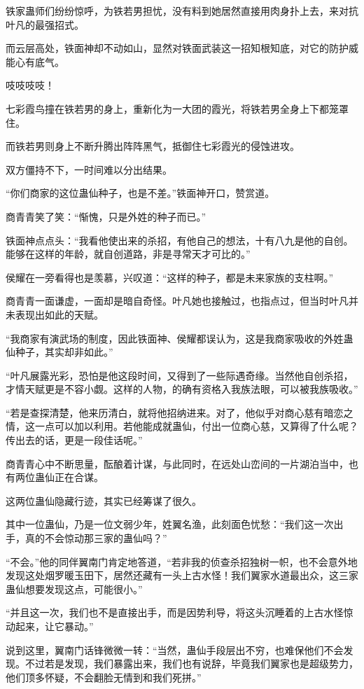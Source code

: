 \begin{this_body}
铁家蛊师们纷纷惊呼，为铁若男担忧，没有料到她居然直接用肉身扑上去，来对抗叶凡的最强招式。

而云层高处，铁面神却不动如山，显然对铁面武装这一招知根知底，对它的防护威能心有底气。

吱吱吱吱！

七彩霞鸟撞在铁若男的身上，重新化为一大团的霞光，将铁若男全身上下都笼罩住。

而铁若男则身上不断升腾出阵阵黑气，抵御住七彩霞光的侵蚀进攻。

双方僵持不下，一时间难以分出结果。

“你们商家的这位蛊仙种子，也是不差。”铁面神开口，赞赏道。

商青青笑了笑：“惭愧，只是外姓的种子而已。”

铁面神点点头：“我看他使出来的杀招，有他自己的想法，十有八九是他的自创。能够在这样的年龄，就自创道路，非是寻常天才可比的。”

侯耀在一旁看得也是羡慕，兴叹道：“这样的种子，都是未来家族的支柱啊。”

商青青一面谦虚，一面却是暗自奇怪。叶凡她也接触过，也指点过，但当时叶凡并未表现出如此的天赋。

“我商家有演武场的制度，因此铁面神、侯耀都误认为，这是我商家吸收的外姓蛊仙种子，其实却非如此。”

“叶凡展露光彩，恐怕是他这段时间，又得到了一些际遇奇缘。当然他自创杀招，才情天赋更是不容小觑。这样的人物，的确有资格入我族法眼，可以被我族吸收。”

“若是查探清楚，他来历清白，就将他招纳进来。对了，他似乎对商心慈有暗恋之情，这一点可以加以利用。若他能成就蛊仙，付出一位商心慈，又算得了什么呢？传出去的话，更是一段佳话呢。”

商青青心中不断思量，酝酿着计谋，与此同时，在远处山峦间的一片湖泊当中，也有两位蛊仙正在合谋。

这两位蛊仙隐藏行迹，其实已经筹谋了很久。

其中一位蛊仙，乃是一位文弱少年，姓翼名渔，此刻面色忧愁：“我们这一次出手，真的不会惊动那三家的蛊仙吗？”

“不会。”他的同伴翼南门肯定地答道，“若非我的侦查杀招独树一帜，也不会意外地发现这处烟罗暖玉田下，居然还藏有一头上古水怪！我们翼家水道最出众，这三家蛊仙想要发现这点，可能很小。”

“并且这一次，我们也不是直接出手，而是因势利导，将这头沉睡着的上古水怪惊动起来，让它暴动。”

说到这里，翼南门话锋微微一转：“当然，蛊仙手段层出不穷，也难保他们不会发现。不过若是发现，我们暴露出来，我们也有说辞，毕竟我们翼家也是超级势力，他们顶多怀疑，不会翻脸无情到和我们死拼。”


\end{this_body}
